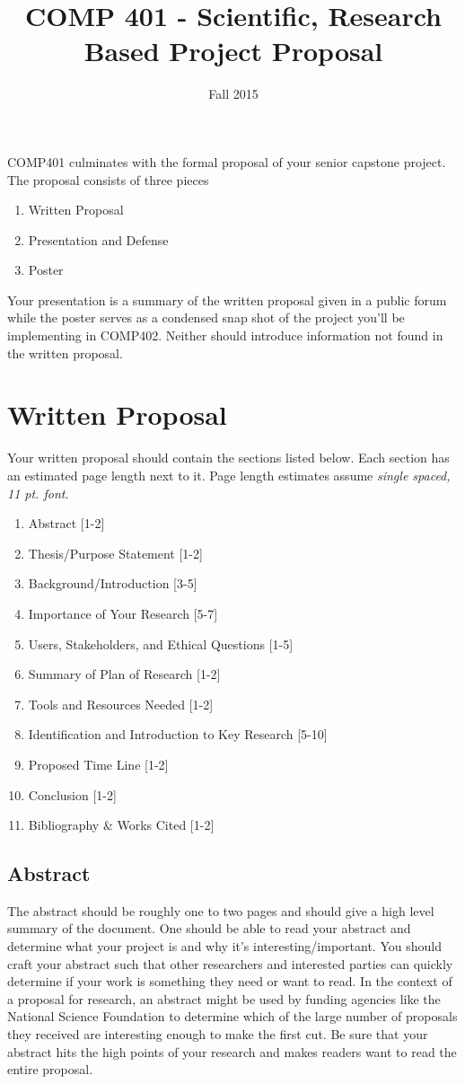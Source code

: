 \documentclass[10pt]{article}
\title{COMP 401 - Scientific, Research Based Project Proposal}
\author{  }
\date{Fall 2015}
\begin{document}
\maketitle

COMP401 culminates with the formal proposal of your senior capstone project.  The proposal consists of three pieces
\begin{enumerate}
\item Written Proposal
\item Presentation and Defense 
\item Poster
\end{enumerate}
Your presentation is a summary of the written proposal given in a public forum while the poster serves as a condensed snap shot of the project you'll be implementing in COMP402.  Neither should introduce information not found in the written proposal.

\section{Written Proposal}

Your written proposal should contain the sections listed below.  Each section has an estimated page length next to it.  Page length estimates assume \textit{single spaced, 11 pt. font}.   
\begin{enumerate}
\item Abstract [1-2]
\item Thesis/Purpose Statement [1-2]
\item Background/Introduction [3-5]
\item Importance of Your Research [5-7]
\item Users, Stakeholders, and Ethical Questions [1-5]
\item Summary of Plan of Research [1-2]
\item Tools and Resources Needed [1-2]
\item Identification and Introduction to Key Research [5-10]
\item Proposed Time Line [1-2]
\item Conclusion [1-2]
\item Bibliography \& Works Cited [1-2]
\end{enumerate}

\subsection{Abstract}
The abstract should be roughly one to two pages and should give a high level summary of the document.  One should be able to read your abstract and determine what your project is and why it's interesting/important.  You should craft your abstract such that other researchers and interested parties can quickly determine if your work is something they need or want to read.  In the context of a proposal for research, an abstract might be used by funding agencies like the National Science Foundation to determine which of the large number of proposals they received are interesting enough to make the first cut.  Be sure that your abstract hits the high points of your research and makes readers want to read the entire proposal.
\end{document}
